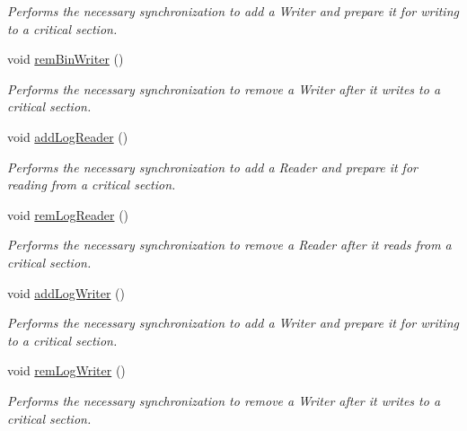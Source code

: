 \begin{DoxyCompactItemize}
\begin{DoxyCompactList}\small\item\em Performs the necessary synchronization to add a Writer and prepare it for writing to a critical section. \end{DoxyCompactList}\item 
\hypertarget{classLogBinMonitor_adbebb020c59d17fa310390cecc033524}{void \hyperlink{classLogBinMonitor_adbebb020c59d17fa310390cecc033524}{rem\-Bin\-Writer} ()}\label{classLogBinMonitor_adbebb020c59d17fa310390cecc033524}

\begin{DoxyCompactList}\small\item\em Performs the necessary synchronization to remove a Writer after it writes to a critical section. \end{DoxyCompactList}\item 
\hypertarget{classLogBinMonitor_ae40acf389c5d12353ea4f1ef1b45ce1d}{void \hyperlink{classLogBinMonitor_ae40acf389c5d12353ea4f1ef1b45ce1d}{add\-Log\-Reader} ()}\label{classLogBinMonitor_ae40acf389c5d12353ea4f1ef1b45ce1d}

\begin{DoxyCompactList}\small\item\em Performs the necessary synchronization to add a Reader and prepare it for reading from a critical section. \end{DoxyCompactList}\item 
\hypertarget{classLogBinMonitor_a1b15b0cd63d7e23eec33667f793b4e78}{void \hyperlink{classLogBinMonitor_a1b15b0cd63d7e23eec33667f793b4e78}{rem\-Log\-Reader} ()}\label{classLogBinMonitor_a1b15b0cd63d7e23eec33667f793b4e78}

\begin{DoxyCompactList}\small\item\em Performs the necessary synchronization to remove a Reader after it reads from a critical section. \end{DoxyCompactList}\item 
\hypertarget{classLogBinMonitor_a709ca4fcc550b7f1c2679b06190bf3eb}{void \hyperlink{classLogBinMonitor_a709ca4fcc550b7f1c2679b06190bf3eb}{add\-Log\-Writer} ()}\label{classLogBinMonitor_a709ca4fcc550b7f1c2679b06190bf3eb}

\begin{DoxyCompactList}\small\item\em Performs the necessary synchronization to add a Writer and prepare it for writing to a critical section. \end{DoxyCompactList}\item 
\hypertarget{classLogBinMonitor_acd86c2c38d05a21225e64184eaf3e6dc}{void \hyperlink{classLogBinMonitor_acd86c2c38d05a21225e64184eaf3e6dc}{rem\-Log\-Writer} ()}\label{classLogBinMonitor_acd86c2c38d05a21225e64184eaf3e6dc}

\begin{DoxyCompactList}\small\item\em Performs the necessary synchronization to remove a Writer after it writes to a critical section. \end{DoxyCompactList}\end{DoxyCompactItemize}


